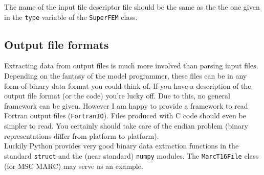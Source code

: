 The name of the input file descriptor file should be the same as the the one
given in the \texttt{type} variable of the \texttt{SuperFEM} class.

\subsection{Output file formats}
\label{sec:output-file-formats}

Extracting data from output files is much more involved than parsing input
files. Depending on the fantasy of the model programmer, these files can be in
any form of binary data format you could think of. If you have a description
of the output file format (or the code) you're lucky off.  Due to this, no
general framework can be given. However I am happy to provide a framework to
read Fortran output files (\texttt{FortranIO}). Files produced with C code
should even be simpler to read. You certainly should take care of the endian
problem (binary representations differ from platform to platform).\\

Luckily Python provides very good binary data extraction functions in the
standard \texttt{struct} and the (near standard) \texttt{numpy} modules. The
\texttt{MarcT16File} class (for MSC MARC) may serve as an example.


